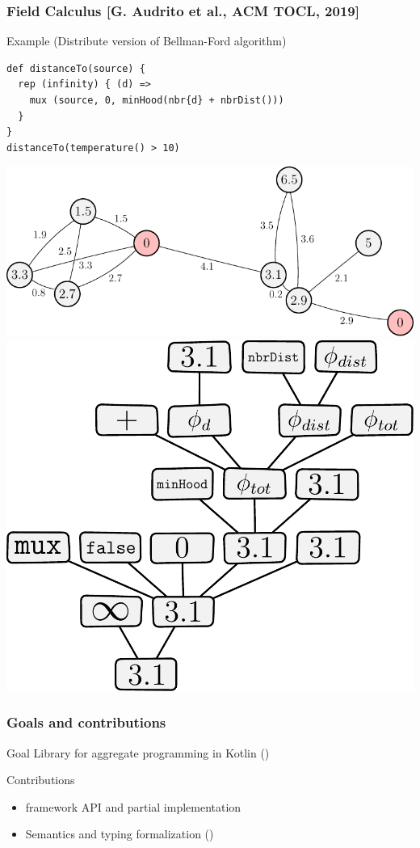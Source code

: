 \begin{frame}[fragile]
\frametitle{Field Calculus \small  [G. Audrito et al., ACM TOCL, 2019]}
	\begin{block}{Example (Distribute version of Bellman-Ford algorithm)}
\begin{lstlisting}[]
def distanceTo(source) {
  rep (infinity) { (d) =>
    mux (source, 0, minHood(nbr{d} + nbrDist()))
  }
}
distanceTo(temperature() > 10)
\end{lstlisting}
\end{block}
\medskip
\includegraphics[width=0.65\linewidth]{imgs/gradient.pdf}
\includegraphics[width=0.3\linewidth]{imgs/valuetree.pdf}
\end{frame}

\begin{frame}
\frametitle{Goals and contributions}
\begin{block}{Goal}
Library for aggregate programming in Kotlin (\Kotac{})
\end{block}
\begin{block}{Contributions}
\begin{itemize}
\item \Kotac{} framework API and partial implementation
\item Semantics and typing formalization (\FKotac{})
\end{itemize}
\end{block}
\end{frame}

